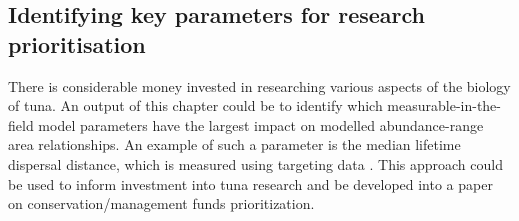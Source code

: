 \documentclass{article}
\begin{document}
\subsection{Identifying key parameters for research prioritisation}

There is considerable money invested in researching various aspects
of the biology of tuna. An output of this chapter could be to
identify which measurable-in-the-field model parameters have the
largest impact on modelled abundance-range area
relationships. An example of such a parameter is the median lifetime
dispersal distance, which is measured using targeting data
\citep[see for e.g.][]{Sibert2003_a}. This approach could be used to
inform investment into tuna research and be developed into a paper on
conservation/management funds prioritization.






\end{document}
